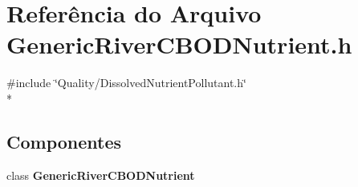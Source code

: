 \section{Referência do Arquivo Generic\+River\+C\+B\+O\+D\+Nutrient.\+h}
\label{_generic_river_c_b_o_d_nutrient_8h}
{\ttfamily \#include \char`\"{}Quality/\+Dissolved\+Nutrient\+Pollutant.\+h\char`\"{}}\\*
\subsection*{Componentes}
\begin{DoxyCompactItemize}
\item 
class {\bf Generic\+River\+C\+B\+O\+D\+Nutrient}
\end{DoxyCompactItemize}
